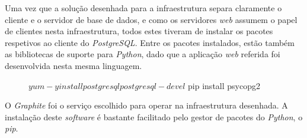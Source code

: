 Uma vez que a solução desenhada para a infraestrutura separa claramente o cliente e o servidor de base de dados, e como os servidores \textit{web} assumem o papel de clientes nesta infraestrutura, todos estes tiveram de instalar os pacotes respetivos ao cliente do \textit{PostgreSQL}.
Entre os pacotes instalados, estão também as bibliotecas de suporte para \textit{Python}, dado que a aplicação \textit{web} referida foi desenvolvida nesta mesma linguagem.

\begin{figure}[!hbt]
\begin{MyVerbatim}
$ yum -y install postgresql postgresql-devel
$ pip install psycopg2
\end{MyVerbatim}
\end{figure}


O \textit{Graphite} foi o serviço escolhido para operar na infraestrutura desenhada.
A instalação deste \textit{software} é bastante facilitado pelo gestor de pacotes do \textit{Python}, o \textit{pip}.

\begin{figure}[!hbt]
\end{figure}

